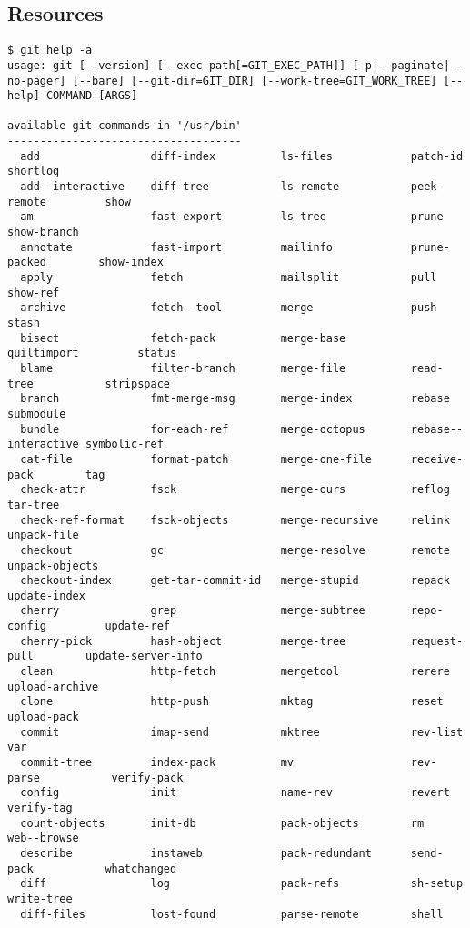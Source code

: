 \subsection{Resources}

\begin{frame}[fragile]
\tiny
\begin{verbatim}
$ git help -a
usage: git [--version] [--exec-path[=GIT_EXEC_PATH]] [-p|--paginate|--no-pager] [--bare] [--git-dir=GIT_DIR] [--work-tree=GIT_WORK_TREE] [--help] COMMAND [ARGS]

available git commands in '/usr/bin'
------------------------------------
  add                 diff-index          ls-files            patch-id            shortlog
  add--interactive    diff-tree           ls-remote           peek-remote         show
  am                  fast-export         ls-tree             prune               show-branch
  annotate            fast-import         mailinfo            prune-packed        show-index
  apply               fetch               mailsplit           pull                show-ref
  archive             fetch--tool         merge               push                stash
  bisect              fetch-pack          merge-base          quiltimport         status
  blame               filter-branch       merge-file          read-tree           stripspace
  branch              fmt-merge-msg       merge-index         rebase              submodule
  bundle              for-each-ref        merge-octopus       rebase--interactive symbolic-ref
  cat-file            format-patch        merge-one-file      receive-pack        tag
  check-attr          fsck                merge-ours          reflog              tar-tree
  check-ref-format    fsck-objects        merge-recursive     relink              unpack-file
  checkout            gc                  merge-resolve       remote              unpack-objects
  checkout-index      get-tar-commit-id   merge-stupid        repack              update-index
  cherry              grep                merge-subtree       repo-config         update-ref
  cherry-pick         hash-object         merge-tree          request-pull        update-server-info
  clean               http-fetch          mergetool           rerere              upload-archive
  clone               http-push           mktag               reset               upload-pack
  commit              imap-send           mktree              rev-list            var
  commit-tree         index-pack          mv                  rev-parse           verify-pack
  config              init                name-rev            revert              verify-tag
  count-objects       init-db             pack-objects        rm                  web--browse
  describe            instaweb            pack-redundant      send-pack           whatchanged
  diff                log                 pack-refs           sh-setup            write-tree
  diff-files          lost-found          parse-remote        shell

\end{verbatim}
\end{frame}

